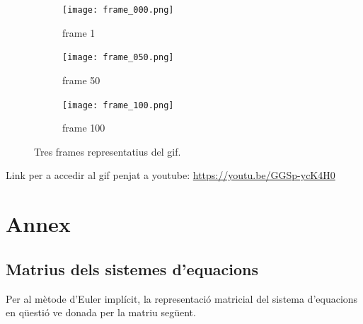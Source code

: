 \documentclass[11pt]{article}
\begin{document}
\begin{figure}[hbt!]
    \centering
    \begin{subfigure}{0.3\textwidth}
        \centering
        \texttt{[image: frame\_000.png]}
        \caption{frame 1}
    \end{subfigure}
    \hspace{0.01\textwidth}
    \begin{subfigure}{0.3\textwidth}
        \centering
        \texttt{[image: frame\_050.png]}
        \caption{frame 50}
    \end{subfigure}
    \hspace{0.01\textwidth}
    \begin{subfigure}{0.3\textwidth}
        \centering
        \texttt{[image: frame\_100.png]}
        \caption{frame 100}
    \end{subfigure}

    \caption{Tres frames representatius del gif.}
    \label{fig:dues_imatges}
\end{figure}

Link per a accedir al gif penjat a youtube: \url{https://youtu.be/GGSp-ycK4H0}

\section{Annex}

\subsection{Matrius dels sistemes d'equacions} \label{subsec: matrius}

Per al mètode d'Euler implícit, la representació matricial del sistema d'equacions en qüestió ve donada per la matriu següent.
\end{document}
